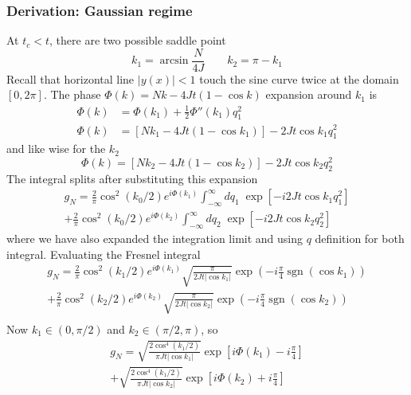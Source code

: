 \documentclass[../../../main.tex]{subfiles}
\begin{document}
\subsubsection{Derivation: Gaussian regime}
At $t_c<t$, there are two possible saddle point
\begin{equation*}
    k_1 = \arcsin \frac{N }{4J}\qquad
    k_2 = \pi -k_1
\end{equation*}
Recall that horizontal line $|y(x)|<1$ touch the sine curve twice at the domain $[0,2\pi]$.
The phase $\Phi(k) =  Nk - 4Jt (1  - \cos k) $ expansion around $k_1$ is
\begin{align*}
    \Phi(k) & = \Phi(k_1) + \frac{1}{2}\Phi''(k_1) q_1^2                      \\
    \Phi(k) & =  \left[ N k_1 - 4Jt(1- \cos k_1) \right] - 2Jt \cos k_1 q_1^2
\end{align*}
and like wise for the $k_2$
\begin{equation*}
    \Phi(k)  =  \left[ N k_2 - 4Jt(1- \cos k_2) \right] - 2Jt \cos k_2 q_2^2
\end{equation*}
The integral splits after substituting this expansion
\begin{multline*}
    g_N = \frac{2}{\pi} \cos^2 (k_0/2) e ^{i\Phi(k_1)}\int_{-\infty} ^{\infty} dq_1\; \exp \left[ - i 2 Jt \cos k_1 q_1^2\right] \\
    + \frac{2}{\pi} \cos^2 (k_0/2) e ^{i\Phi(k_2)}\int_{-\infty} ^{\infty} dq_2\; \exp \left[ - i 2 Jt \cos k_2 q_2^2\right]
\end{multline*}
where we have also expanded the integration limit and using $q$ definition for both integral.
Evaluating the Fresnel integral
\begin{multline*}
    g_N = \frac{2}{\pi} \cos^2 (k_1/2) e ^{i\Phi(k_1)} \sqrt{\frac{\pi }{2Jt |\cos k_1|}} \exp \left( -i \frac{\pi }{4} \operatorname{sgn} (\cos k_1) \right)  \\
    + \frac{2}{\pi} \cos^2 (k_2/2) e ^{i\Phi(k_2)} \sqrt{\frac{\pi }{2Jt |\cos k_2|}} \exp \left( -i \frac{\pi }{4} \operatorname{sgn} (\cos k_2) \right)  \\
\end{multline*}
Now $k_1 \in (0,\pi/2)$ and $k_2 \in (\pi/2,\pi)$, so
\begin{multline*}
    g_N = \sqrt{\frac{2 \cos^4 (k_1/2)}{\pi Jt |\cos k_1|}} \exp \left[ i\Phi(k_1) -i \frac{\pi }{4}\right]  \\
    + \sqrt{\frac{2 \cos^4 (k_1/2)}{\pi Jt |\cos k_2|}} \exp \left[i\Phi(k_2) +i \frac{\pi }{4}  \right]
\end{multline*}
\end{document}
